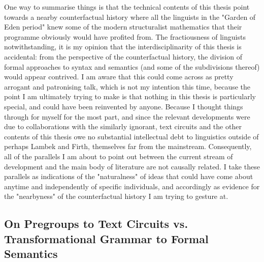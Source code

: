 One way to summarise things is that the technical contents of this thesis point towards a nearby counterfactual history where all the linguists in the "Garden of Eden period" \cite{} knew some of the modern structuralist mathematics that their programme obviously would have profited from. The fractiousness of linguists notwithstanding, it is my opinion that the interdisciplinarity of this thesis is accidental: from the perspective of the counterfactual history, the division of formal approaches to syntax and semantics (and some of the subdivisions thereof) would appear contrived. I am aware that this could come across as pretty arrogant and patronising talk, which is not my intention this time, because the point I am ultimately trying to make is that nothing in this thesis is particularly special, and could have been reinvented by anyone. Because I thought things through for myself for the most part, and since the relevant developments were due to collaborations with the similarly ignorant, text circuits and the other contents of this thesis owe no substantial intellectual debt to linguistics outside of perhaps Lambek and Firth, themselves far from the mainstream. Consequently, all of the parallels I am about to point out between the current stream of development and the main body of literature are not causally related. I take these parallels as indications of the "naturalness" of ideas that could have come about anytime and independently of specific individuals, and accordingly as evidence for the "nearbyness" of the counterfactual history I am trying to gesture at.

\subsection{On Pregroups to Text Circuits vs. Transformational Grammar to Formal Semantics}


